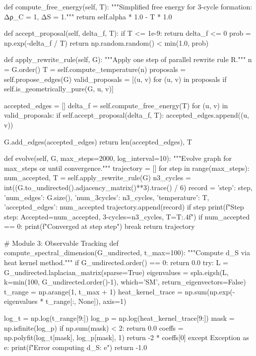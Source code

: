 \documentclass[11pt, a4paper]{article}
\begin{document}
    def compute_free_energy(self, T):
        """Simplified free energy for 3-cycle formation: Δρ_C = 1, ΔS = 1."""
        return self.alpha * 1.0 - T * 1.0
    
    def accept_proposal(self, delta_f, T):
        if T <= 1e-9: return delta_f <= 0
        prob = np.exp(-delta_f / T)
        return np.random.random() < min(1.0, prob)
    
    def apply_rewrite_rule(self, G):
        """Apply one step of parallel rewrite rule R."""
        n = G.order()
        T = self.compute_temperature(n)
        proposals = self.propose_edges(G)
        valid_proposals = [(u, v) for (u, v) in proposals if self.is_geometrically_pure(G, u, v)]
        
        accepted_edges = []
        delta_f = self.compute_free_energy(T)
        for (u, v) in valid_proposals:
            if self.accept_proposal(delta_f, T):
                accepted_edges.append((u, v))
        
        G.add_edges(accepted_edges)
        return len(accepted_edges), T

    def evolve(self, G, max_steps=2000, log_interval=10):
        """Evolve graph for max_steps or until convergence."""
        trajectory = []
        for step in range(max_steps):
            num_accepted, T = self.apply_rewrite_rule(G)
            n3_cycles = int((G.to_undirected().adjacency_matrix()**3).trace() / 6)
            record = {
                'step': step, 'num_edges': G.size(), 'num_3cycles': n3_cycles,
                'temperature': T, 'accepted_edges': num_accepted
            }
            trajectory.append(record)
            if step %
                print(f"Step {step}: Accepted={num_accepted}, 3-cycles={n3_cycles}, T={T:.4f}")
            if num_accepted == 0:
                print(f"Converged at step {step}")
                break
        return trajectory

# Module 3: Observable Tracking
def compute_spectral_dimension(G_undirected, t_max=100):
    """Compute d_S via heat kernel method."""
    if G_undirected.order() == 0:
        return 0.0
    try:
        L = G_undirected.laplacian_matrix(sparse=True)
        eigenvalues = spla.eigsh(L, k=min(100, G_undirected.order()-1), which='SM', return_eigenvectors=False)
        t_range = np.arange(1, t_max + 1)
        heat_kernel_trace = np.sum(np.exp(-eigenvalues * t_range[:, None]), axis=1)
        
        log_t = np.log(t_range[9:])
        log_p = np.log(heat_kernel_trace[9:])
        mask = np.isfinite(log_p)
        if np.sum(mask) < 2:
            return 0.0
        coeffs = np.polyfit(log_t[mask], log_p[mask], 1)
        return -2 * coeffs[0]
    except Exception as e:
        print(f"Error computing d_S: {e}")
        return -1.0
\end{document}
